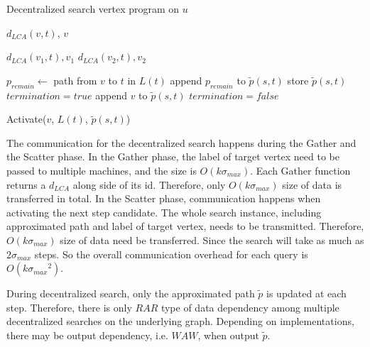 \begin{algorithm}
    \caption{Decentralized search vertex program on $u$}
		\label{alg:vc_dec}
    \begin{algorithmic}
						\State \Return $d_{LCA}(v, t)$, $v$
				\EndFunction

								\State \Return $d_{LCA}(v_1,t), v_1$
						\Else
								\State \Return $d_{LCA}(v_2,t), v_2$
						\EndIf
				\EndFunction

								\State $p_{remain} \gets$ path from $v$ to $t$ in $L(t)$
								\State append $p_{remain}$ to $\tilde{p}(s,t)$
								\State store $\tilde{p}(s,t)$
								\State $termination = true$
						\Else
								\State append $v$ to $\tilde{p}(s,t)$
								\State $termination = false$
						\EndIf
				\EndFunction

						\If {$\neg termination$}
								\State Activate($v$, $L(t)$, $\tilde{p}(s,t)$)
						\EndIf
        \EndFunction
    \end{algorithmic}
\end{algorithm}

The communication for the decentralized search happens during the Gather and the Scatter phase. In the Gather phase, the label of target vertex need to be passed to multiple machines, and the size is $O(k{\sigma}_{max})$. Each Gather function returns a $d_{LCA}$ along side of its id. Therefore, only $O(k{\sigma}_{max})$ size of data is transferred in total. In the Scatter phase, communication happens when activating the next step candidate. The whole search instance, including approximated path and label of target vertex, needs to be transmitted. Therefore, $O(k{\sigma}_{max})$ size of data need be transferred. Since the search will take as much as $2{\sigma}_{max}$ steps. So the overall communication overhead for each query is $O(k{{\sigma}_{max}}^2)$. 

During decentralized search, only the approximated path $\tilde{p}$ is updated at each step. Therefore, there is only $RAR$ type of data dependency among multiple decentralized searches on the underlying graph. Depending on implementations, there may be output dependency, i.e. $WAW$, when output $\tilde{p}$.

